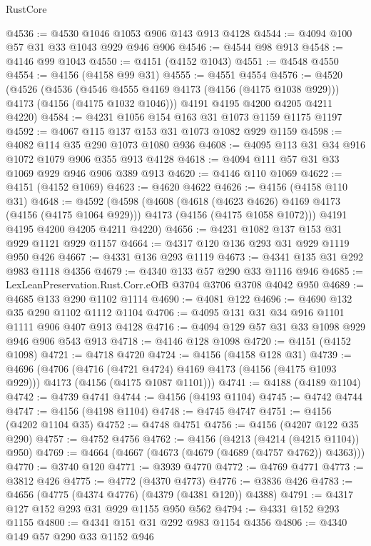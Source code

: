 \begin{lexlean}{RustCore}
\begin{coremodule}
@4536 := @4530 @1046 @1053 @906 @143 @913 @4128
@4544 := @4094 @100 @57 @31 @33 @1043 @929 @946 @906
@4546 := @4544 @98 @913
@4548 := @4146 @99 @1043
@4550 := @4151 (@4152 @1043)
@4551 := @4548 @4550
@4554 := @4156 (@4158 @99 @31)
@4555 := @4551 @4554
@4576 := @4520
    (@4526
      (@4536 (@4546 @4555 @4169 @4173 (@4156 (@4175 @1038 @929))) @4173 (@4156 (@4175 @1032 @1046)))
      @4191
      @4195
      @4200
      @4205
      @4211
      @4220)
@4584 := @4231 @1056 @154 @163 @31 @1073 @1159 @1175 @1197
@4592 := @4067 @115 @137 @153 @31 @1073 @1082 @929 @1159
@4598 := @4082 @114 @35 @290 @1073 @1080 @936
@4608 := @4095 @113 @31 @34 @916 @1072 @1079 @906 @355 @913 @4128
@4618 := @4094 @111 @57 @31 @33 @1069 @929 @946 @906 @389 @913
@4620 := @4146 @110 @1069
@4622 := @4151 (@4152 @1069)
@4623 := @4620 @4622
@4626 := @4156 (@4158 @110 @31)
@4648 := @4592
    (@4598
      (@4608
        (@4618 (@4623 @4626) @4169 @4173 (@4156 (@4175 @1064 @929)))
        @4173
        (@4156 (@4175 @1058 @1072)))
      @4191
      @4195
      @4200
      @4205
      @4211
      @4220)
@4656 := @4231 @1082 @137 @153 @31 @929 @1121 @929 @1157
@4664 := @4317 @120 @136 @293 @31 @929 @1119 @950 @426
@4667 := @4331 @136 @293 @1119
@4673 := @4341 @135 @31 @292 @983 @1118 @4356
@4679 := @4340 @133 @57 @290 @33 @1116 @946
@4685 := LexLeanPreservation.Rust.Corr.eOfB @3704 @3706 @3708 @4042 @950
@4689 := @4685 @133 @290 @1102 @1114
@4690 := @4081 @122
@4696 := @4690 @132 @35 @290 @1102 @1112 @1104
@4706 := @4095 @131 @31 @34 @916 @1101 @1111 @906 @407 @913 @4128
@4716 := @4094 @129 @57 @31 @33 @1098 @929 @946 @906 @543 @913
@4718 := @4146 @128 @1098
@4720 := @4151 (@4152 @1098)
@4721 := @4718 @4720
@4724 := @4156 (@4158 @128 @31)
@4739 := @4696
    (@4706
      (@4716 (@4721 @4724) @4169 @4173 (@4156 (@4175 @1093 @929)))
      @4173
      (@4156 (@4175 @1087 @1101)))
@4741 := @4188 (@4189 @1104)
@4742 := @4739 @4741
@4744 := @4156 (@4193 @1104)
@4745 := @4742 @4744
@4747 := @4156 (@4198 @1104)
@4748 := @4745 @4747
@4751 := @4156 (@4202 @1104 @35)
@4752 := @4748 @4751
@4756 := @4156 (@4207 @122 @35 @290)
@4757 := @4752 @4756
@4762 := @4156 (@4213 (@4214 (@4215 @1104)) @950)
@4769 := @4664 (@4667 (@4673 (@4679 (@4689 (@4757 @4762)) @4363)))
@4770 := @3740 @120
@4771 := @3939 @4770
@4772 := @4769 @4771
@4773 := @3812 @426
@4775 := @4772 (@4370 @4773)
@4776 := @3836 @426
@4783 := @4656 (@4775 (@4374 @4776) (@4379 (@4381 @120)) @4388)
@4791 := @4317 @127 @152 @293 @31 @929 @1155 @950 @562
@4794 := @4331 @152 @293 @1155
@4800 := @4341 @151 @31 @292 @983 @1154 @4356
@4806 := @4340 @149 @57 @290 @33 @1152 @946

\end{coremodule}
\end{lexlean}
